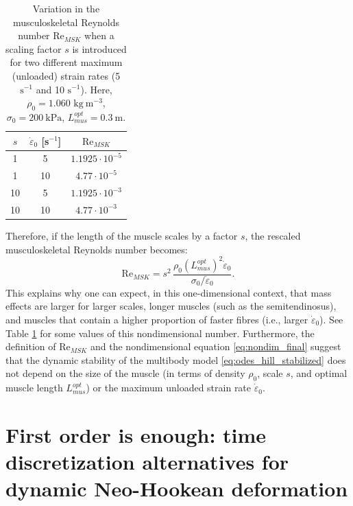 \documentclass{sfuthesis}
\numberwithin{equation}{section}
\numberwithin{figure}{chapter}
\numberwithin{table}{chapter}
\theoremstyle{definition}
\newcommand{\depsilon}{\dot{\varepsilon}}
\begin{document}
\begin{table}
    \centering
    \begin{tabular}{|c|c|c|} \hline
        $s$ & $\depsilon_0$ [s$^{-1}$] & $\text{Re}_{MSK}$ \\\hline
        1 & 5 & $1.1925 \cdot 10^{-5}$ \\\hline
        1 & 10 & $4.77 \cdot 10^{-5}$ \\\hline
        10 & 5 & $1.1925 \cdot 10^{-3}$  \\\hline
        10 & 10 & $4.77 \cdot 10^{-3}$  \\\hline
    \end{tabular}
    \caption{Variation in the musculoskeletal Reynolds number $\text{Re}_{MSK}$ when a scaling factor $s$ is introduced for two different maximum (unloaded) strain rates (5 $\text{s}^{-1}$ and 10 $\text{s}^{-1}$). Here, $\rho_0 = 1.060 \text{ kg} \ \text{m}^{-3}$, $\sigma_0 = 200 \ \text{kPa}$, $L_{mus}^{opt} = 0.3 \ \text{m}$.}
    \label{tab:re_msk}
\end{table}

Therefore, if the length of the muscle scales by a factor $s$, the rescaled musculoskeletal Reynolds number becomes:
\begin{equation} \label{eq:nondim_final}
    \text{Re}_{MSK} = s^2 \, \dfrac{\rho_0 (L_{mus}^{opt})^2 \depsilon_0}{\sigma_0 / \depsilon_0}.
\end{equation}
This explains why one can expect, in this one-dimensional context, that mass effects are larger for larger scales, longer muscles (such as the semitendinosus), and muscles that contain a higher proportion of faster fibres (i.e., larger $\depsilon_0$). See Table \ref{tab:re_msk} for some values of this nondimensional number. Furthermore, the definition of $\text{Re}_{MSK}$ and the nondimensional equation \eqref{eq:nondim_final} suggest that the dynamic stability of the multibody model \eqref{eq:odes_hill_stabilized} does not depend on the size of the muscle (in terms of density $\rho_0$, scale $s$, and optimal muscle length $L_{mus}^{opt}$) or the maximum unloaded strain rate $\depsilon_0$.


\chapter{First order is enough: time discretization alternatives for dynamic Neo-Hookean deformation} \label{ch:neohookean}

\end{document}
